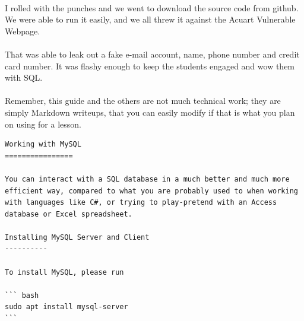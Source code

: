 \documentclass[11pt]{article}
\begin{document}
	\begin{center}
		\graphicspath{ {.} }
		\centering
	\end{center}


	\paragraph{} I rolled with the punches and we went to download the source code from github. We were able to run it easily, and we all threw it against the Acuart Vulnerable Webpage.

	\paragraph{} That was able to leak out a fake e-mail account, name, phone number and credit card number. It was flashy enough to keep the students engaged and wow them with SQL. 

	\begin{center}
		\graphicspath{ {.} }
		\centering
	\end{center}

	\paragraph{} Remember, this guide and the others are not much technical work; they are simply Markdown writeups, that you can easily modify if that is what you plan on using for a lesson.\\

	\begin{lstlisting}[]
Working with MySQL
================

You can interact with a SQL database in a much better and much more efficient way, compared to what you are probably used to when working with languages like C#, or trying to play-pretend with an Access database or Excel spreadsheet.

Installing MySQL Server and Client
----------

To install MySQL, please run

``` bash
sudo apt install mysql-server
```

\end{lstlisting}
\end{document}
